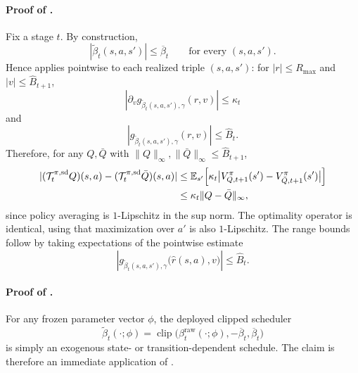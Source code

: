 \documentclass{article}
\theoremstyle{remark}
\newcommand{\E}{\mathbb{E}}
\newcommand{\cT}{\mathcal{T}}
\DeclareMathOperator{\clip}{clip}
\newcommand{\betacap}{\overline\beta}
\newcommand{\Bhat}{\widehat B}
\begin{document}
\paragraph{Proof of .}
Fix a stage $t$.
By construction,
\[
|\widetilde\beta_t(s,a,s')|\le \betacap_t
\qquad \text{for every }(s,a,s').
\]
Hence  applies pointwise to each realized triple $(s,a,s')$:
for $|r|\le R_{\max}$ and $|v|\le \Bhat_{t+1}$,
\[
\left|\partial_v g_{\widetilde\beta_t(s,a,s'),\gamma}(r,v)\right|\le \kappa_t
\]
and
\[
\left|g_{\widetilde\beta_t(s,a,s'),\gamma}(r,v)\right|\le \Bhat_t.
\]
Therefore, for any $Q,\bar Q$ with $\|Q\|_\infty,\|\bar Q\|_\infty\le \Bhat_{t+1}$,
\begin{align*}
|(\cT_t^{\pi,\mathrm{sd}}Q)(s,a)-(\cT_t^{\pi,\mathrm{sd}}\bar Q)(s,a)|
&\le
\E_{s'}\Bigl[
\kappa_t
\bigl|V_{Q,t+1}^\pi(s')-V_{\bar Q,t+1}^\pi(s')\bigr|
\Bigr]\\
&\le
\kappa_t\|Q-\bar Q\|_\infty,
\end{align*}
since policy averaging is $1$-Lipschitz in the sup norm.
The optimality operator is identical, using that maximization over $a'$ is also $1$-Lipschitz.
The range bounds follow by taking expectations of the pointwise estimate
\[
\left|g_{\widetilde\beta_t(s,a,s'),\gamma}\bigl(\hat r(s,a),v\bigr)\right|\le \Bhat_t.
\]

\paragraph{Proof of .}
For any frozen parameter vector $\phi$, the deployed clipped scheduler
\[
\widetilde\beta_t(\cdot;\phi)=\clip\bigl(\beta_t^{\mathrm{raw}}(\cdot;\phi),-\betacap_t,\betacap_t\bigr)
\]
is simply an exogenous state- or transition-dependent schedule. The claim is therefore an immediate application of .
\end{document}
